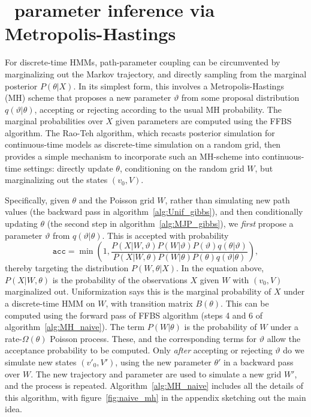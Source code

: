 \vspace{-.2in}
\section{\Naive\ parameter inference via Metropolis-Hastings}
For discrete-time HMMs, path-parameter coupling can be circumvented by marginalizing out the Markov trajectory, and directly sampling from the marginal posterior $P(\theta|X)$.
In its simplest form, this involves a Metropolis-Hastings (MH) scheme that proposes a new parameter $\vartheta$ from some proposal distribution $q(\vartheta|\theta)$, accepting or rejecting according to the usual MH probability.
The marginal probabilities over $X$ given parameters are computed using the FFBS algorithm.
The Rao-Teh algorithm, which recasts posterior simulation for continuous-time models as discrete-time simulation on a random grid, then provides a simple mechanism to incorporate such an MH-scheme into continuous-time settings: directly update $\theta$, conditioning on the random grid $W$, but marginalizing out the states $(v_0, V)$.

Specifically, given $\theta$ and the Poisson grid $W$, rather than simulating new path values (the backward pass in algorithm~\ref{alg:Unif_gibbs}), and then conditionally updating $\theta$ (the second step in algorithm~\ref{alg:MJP_gibbs}), we {\em first} propose a parameter $\vartheta$ from $q(\vartheta|\theta)$. This is accepted with probability 
$$ \texttt{acc} = \min\left(1, 
\frac{P(X|W,\vartheta) P(W|\vartheta)P(\vartheta)q(\theta|\vartheta)} {P(X|W,\theta) P(W|\theta)P(\theta)q(\vartheta|\theta)}\right),$$ 
thereby targeting the distribution $P(W,\theta|X)$.
In the equation above, $P(X|W,\theta)$ is the probability of the observations $X$ given $W$ with $(v_0,V)$ marginalized out. 
Uniformization says this is the marginal probability of $X$ under a discrete-time HMM on $W$, with transition matrix $B(\theta)$. This can be computed using the forward pass of FFBS algorithm (steps 4 and 6 of algorithm~\ref{alg:MH_naive}). 
The term $P(W|\theta)$ is the probability of $W$ under a rate-$\Omega(\theta)$ Poisson process. 
These, and the corresponding terms for $\vartheta$ allow the acceptance probability to be computed.
Only {\em after} accepting or rejecting $\vartheta$ do we simulate new states $(v'_0,V')$, using the new parameter $\theta'$ in a backward pass over $W$. 
The new trajectory and parameter are used to simulate a new grid $W'$, and the process is repeated.
Algorithm~\ref{alg:MH_naive} includes all the details of this algorithm, with figure~\ref{fig:naive_mh} in the appendix sketching out the main idea.

